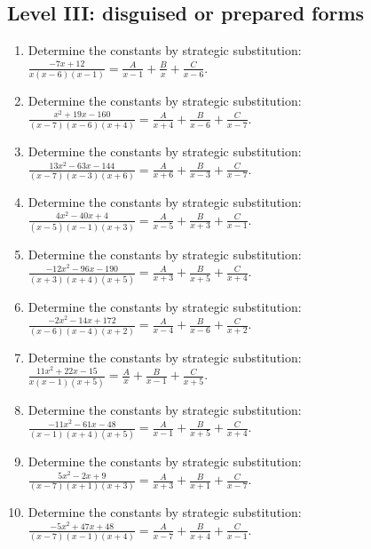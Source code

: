 \documentclass[11pt,oneside]{book}
\begin{document}
\subsection*{Level III: disguised or prepared forms}
\begin{enumerate}[leftmargin=*,label=\textbf{\arabic*.},itemsep=0.65\baselineskip]
\item Determine the constants by strategic substitution: $\displaystyle \frac{- 7 x + 12}{x \left(x - 6\right) \left(x - 1\right)}=\frac{A}{x - 1} + \frac{B}{x} + \frac{C}{x - 6}$.
\item Determine the constants by strategic substitution: $\displaystyle \frac{x^{2} + 19 x - 160}{\left(x - 7\right) \left(x - 6\right) \left(x + 4\right)}=\frac{A}{x + 4} + \frac{B}{x - 6} + \frac{C}{x - 7}$.
\item Determine the constants by strategic substitution: $\displaystyle \frac{13 x^{2} - 63 x - 144}{\left(x - 7\right) \left(x - 3\right) \left(x + 6\right)}=\frac{A}{x + 6} + \frac{B}{x - 3} + \frac{C}{x - 7}$.
\item Determine the constants by strategic substitution: $\displaystyle \frac{4 x^{2} - 40 x + 4}{\left(x - 5\right) \left(x - 1\right) \left(x + 3\right)}=\frac{A}{x - 5} + \frac{B}{x + 3} + \frac{C}{x - 1}$.
\item Determine the constants by strategic substitution: $\displaystyle \frac{- 12 x^{2} - 96 x - 190}{\left(x + 3\right) \left(x + 4\right) \left(x + 5\right)}=\frac{A}{x + 3} + \frac{B}{x + 5} + \frac{C}{x + 4}$.
\item Determine the constants by strategic substitution: $\displaystyle \frac{- 2 x^{2} - 14 x + 172}{\left(x - 6\right) \left(x - 4\right) \left(x + 2\right)}=\frac{A}{x - 4} + \frac{B}{x - 6} + \frac{C}{x + 2}$.
\item Determine the constants by strategic substitution: $\displaystyle \frac{11 x^{2} + 22 x - 15}{x \left(x - 1\right) \left(x + 5\right)}=\frac{A}{x} + \frac{B}{x - 1} + \frac{C}{x + 5}$.
\item Determine the constants by strategic substitution: $\displaystyle \frac{- 11 x^{2} - 61 x - 48}{\left(x - 1\right) \left(x + 4\right) \left(x + 5\right)}=\frac{A}{x - 1} + \frac{B}{x + 5} + \frac{C}{x + 4}$.
\item Determine the constants by strategic substitution: $\displaystyle \frac{5 x^{2} - 2 x + 9}{\left(x - 7\right) \left(x + 1\right) \left(x + 3\right)}=\frac{A}{x + 3} + \frac{B}{x + 1} + \frac{C}{x - 7}$.
\item Determine the constants by strategic substitution: $\displaystyle \frac{- 5 x^{2} + 47 x + 48}{\left(x - 7\right) \left(x - 1\right) \left(x + 4\right)}=\frac{A}{x - 7} + \frac{B}{x + 4} + \frac{C}{x - 1}$.
\end{enumerate}
\end{document}
